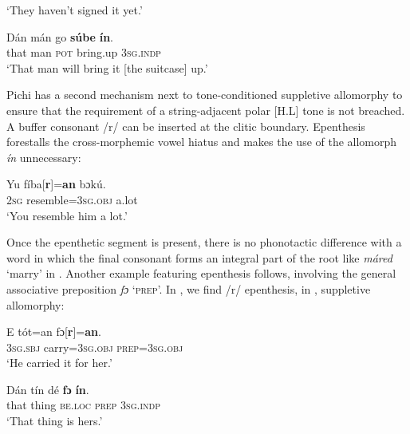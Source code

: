 \glt ‘They haven't signed it yet.’\\

\z

\ea%
    \label{ex:key:71}
    \gll   Dán    mán    go  \textbf{súbe}  \textbf{ín}.\\
that    man    \textsc{pot}  bring.up  \textsc{3sg.indp}\\

\glt ‘That man will bring it [the suitcase] up.’
\z

Pichi has a second mechanism next to tone-conditioned suppletive allomorphy to ensure that the requirement of a string-adjacent polar [H.L] tone is not breached. A buffer consonant /r/ can be inserted at the clitic boundary. Epenthesis forestalls the cross-morphemic vowel hiatus and makes the use of the allomorph \textit{ín} unnecessary:


\ea%
    \label{ex:key:72}
    \gll   Yu  fíba[\textbf{r}]=\textbf{an}    bɔkú.\\
\textsc{2sg}  resemble=\textsc{3sg.obj}  a.lot\\

\glt ‘You resemble him a lot.’ 
\z

Once the epenthetic segment is present, there is no phonotactic difference with a word in which the final consonant forms an integral part of the root like \textit{máred} ‘marry’ in . Another example featuring epenthesis follows, involving the general associative preposition \textit{fɔ} ‘\textsc{prep}’. In , we find /r/ epenthesis, in , suppletive allomorphy:


\ea%
    \label{ex:key:73}
    \gll   E    tót=an    fɔ[\textbf{r}]=\textbf{an}.\\
\textsc{3sg.sbj}  carry=\textsc{3sg.obj}  \textsc{prep=3sg.obj}\\

\glt ‘He carried it for her.’
\z


\ea%
    \label{ex:key:74}
    \gll   Dán    tín    dé    \textbf{fɔ}  \textbf{ín}.\\
that    thing  \textsc{be.loc}  \textsc{prep}  \textsc{3sg.indp}\\

\glt ‘That thing is hers.’
\z

